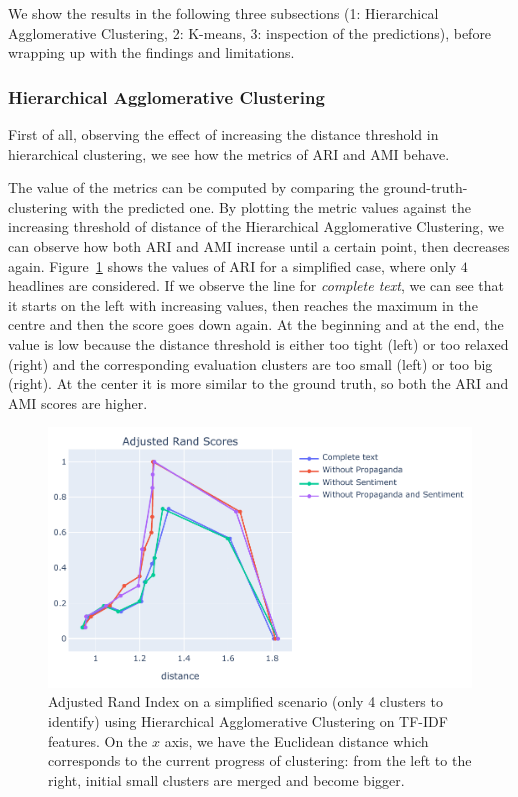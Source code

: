 
We show the results in the following three subsections (1: Hierarchical Agglomerative Clustering, 2: K-means, 3: inspection of the predictions), before wrapping up with the findings and limitations. %


\subsubsection{Hierarchical Agglomerative Clustering}
First of all, observing the effect of increasing the distance threshold in hierarchical clustering, we see how the metrics of ARI and AMI behave.

The value of the metrics can be computed by comparing the ground-truth-clustering with the predicted one.
By plotting the metric values against the increasing threshold of distance of the Hierarchical Agglomerative Clustering, we can observe how both ARI and AMI increase until a certain point, then decreases again.
Figure~\ref{fig:hierarchical_sentpropnoise_evolution} shows the values of ARI for a simplified case, where only $4$ headlines are considered. If we observe the line for \textit{complete text}, we can see that it starts on the left with increasing values, then reaches the maximum in the centre and then the score goes down again. At the beginning and at the end, the value is low because the distance threshold is either too tight (left) or too relaxed (right) and the corresponding evaluation clusters are too small (left) or too big (right).
At the center it is more similar to the ground truth, so both the ARI and AMI scores are higher.

\begin{figure}[!htbp]
    \centering
    \includegraphics[width=\linewidth]{figures/sentpropnoise_4_en_tfidf_fitness_topic-cropped.pdf}
    \caption{Adjusted Rand Index on a simplified scenario (only 4 clusters to identify) using Hierarchical Agglomerative Clustering on TF-IDF features. On the $x$ axis, we have the Euclidean distance which corresponds to the current progress of clustering: from the left to the right, initial small clusters are merged and become bigger.}
    \label{fig:hierarchical_sentpropnoise_evolution}
\end{figure}

